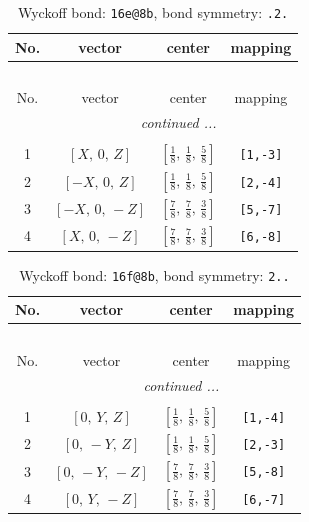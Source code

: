 \documentclass[fleqn,8pt]{jsarticle}
\begin{document}
\renewcommand{\arraystretch}{1.2}
\begin{longtable}{cccc}
\caption{Wyckoff bond: {\tt 16e@8b}, bond symmetry: {\tt .2.}}
 \\
 \hline \hline
No. & vector & center & mapping \\ \hline \endfirsthead

\multicolumn{3}{l}{\tablename\ \thetable{}} \\
 \hline \hline
No. & vector & center & mapping \\ \hline \endhead

 \hline \hline
\multicolumn{3}{r}{\footnotesize\it continued ...} \\ \endfoot

 \hline \hline
\multicolumn{3}{r}{} \\ \endlastfoot

1 & $\left[ X,\, 0,\, Z \right]$ & $\left[ \frac{1}{8},\, \frac{1}{8},\, \frac{5}{8} \right]$ & {\tt [1,-3]} \\ \hline
2 & $\left[ - X,\, 0,\, Z \right]$ & $\left[ \frac{1}{8},\, \frac{1}{8},\, \frac{5}{8} \right]$ & {\tt [2,-4]} \\ \hline
3 & $\left[ - X,\, 0,\, - Z \right]$ & $\left[ \frac{7}{8},\, \frac{7}{8},\, \frac{3}{8} \right]$ & {\tt [5,-7]} \\ \hline
4 & $\left[ X,\, 0,\, - Z \right]$ & $\left[ \frac{7}{8},\, \frac{7}{8},\, \frac{3}{8} \right]$ & {\tt [6,-8]} \\
\end{longtable}
\renewcommand{\arraystretch}{1.2}
\begin{longtable}{cccc}
\caption{Wyckoff bond: {\tt 16f@8b}, bond symmetry: {\tt 2..}}
 \\
 \hline \hline
No. & vector & center & mapping \\ \hline \endfirsthead

\multicolumn{3}{l}{\tablename\ \thetable{}} \\
 \hline \hline
No. & vector & center & mapping \\ \hline \endhead

 \hline \hline
\multicolumn{3}{r}{\footnotesize\it continued ...} \\ \endfoot

 \hline \hline
\multicolumn{3}{r}{} \\ \endlastfoot

1 & $\left[ 0,\, Y,\, Z \right]$ & $\left[ \frac{1}{8},\, \frac{1}{8},\, \frac{5}{8} \right]$ & {\tt [1,-4]} \\ \hline
2 & $\left[ 0,\, - Y,\, Z \right]$ & $\left[ \frac{1}{8},\, \frac{1}{8},\, \frac{5}{8} \right]$ & {\tt [2,-3]} \\ \hline
3 & $\left[ 0,\, - Y,\, - Z \right]$ & $\left[ \frac{7}{8},\, \frac{7}{8},\, \frac{3}{8} \right]$ & {\tt [5,-8]} \\ \hline
4 & $\left[ 0,\, Y,\, - Z \right]$ & $\left[ \frac{7}{8},\, \frac{7}{8},\, \frac{3}{8} \right]$ & {\tt [6,-7]} \\
\end{longtable}
\end{document}
